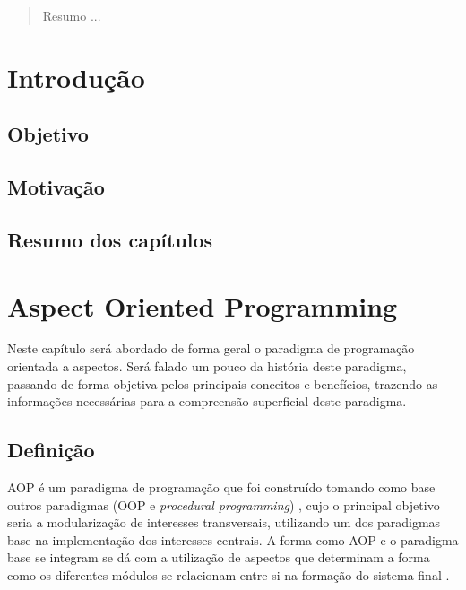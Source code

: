\documentclass[tc,openright]{iiufrgs}
\begin{document}
\listoffigures

\listoftables

\begin{abstract}

Resumo ...

\end{abstract}

\chapter{Introdução}
\section{Objetivo}
\section{Motivação}
\section{Resumo dos capítulos}
 
\chapter{Aspect Oriented Programming}
Neste capítulo será abordado de forma geral o paradigma de programação orientada a aspectos. Será falado um pouco da história deste paradigma, passando de forma objetiva pelos principais conceitos e benefícios, trazendo as informações necessárias para a compreensão superficial deste paradigma.
\section{Definição}
AOP é um paradigma de programação que foi construído tomando como base outros paradigmas (OOP e \textit{procedural programming}) , cujo o principal objetivo seria a modularização de interesses transversais, utilizando um dos paradigmas base na implementação dos interesses centrais. A forma como AOP e o paradigma base se integram se dá com a utilização de aspectos que determinam a forma como os diferentes módulos se relacionam entre si na formação do sistema final \cite{laddad2003aspectj}.
\end{document}
